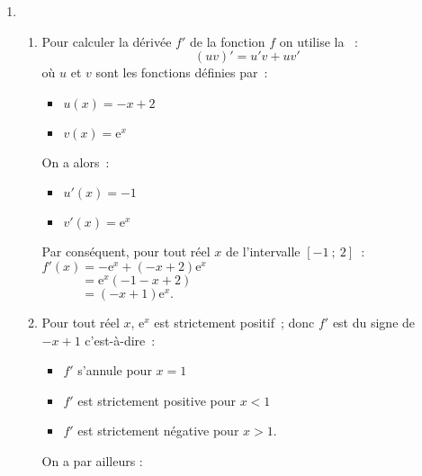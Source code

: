 \begin{corrige}
     \begin{enumerate}
          \item
          \begin{enumerate}[label=\alph*.]
               \item
               Pour calculer la dérivée $f'$ de la fonction $f$ on utilise la ~:
               \[
               ( uv )' =u' v+uv'
               \]
               où  $u$ et $v$ sont les fonctions définies par~:\\
               \begin{itemize}
                    \item
                    $u( x )= - x+2$
                    \item
                    $v( x )=\text{e}^{ x }$
               \end{itemize}
               On a alors~:
               \begin{itemize}
                    \item
                    $u' ( x )= - 1$
                    \item
                    $v' ( x )=\text{e}^{ x }$
               \end{itemize}
               Par conséquent, pour tout réel $x$ de l'intervalle  $\left[  - 1~;~2\right]$~:
               \newpar
               $f' ( x )= - \text{e}^{ x }+(  - x+2 )\text{e}^{ x }$\\
               $\phantom{f' ( x )}=\text{e}^{ x }\left(  - 1 - x+2 \right)$\\
               $\phantom{f' ( x )}=\left(  - x+1 \right)\text{e}^{ x }.$
               \item
               Pour tout réel $x$,  $\text{e}^{ x }$ est strictement positif~; donc $f' $ est du signe de  $ - x+1$ c'est-à-dire~:
               \begin{itemize}
                    \item
                    $f' $ s'annule pour $x=1$
                    \item
                    $f' $ est strictement positive pour $x < 1$
                    \item
                    $f' $ est strictement négative pour $x > 1. $
               \end{itemize}
               \newpar
               On a par ailleurs :
               \begin{itemize}

\end{itemize}
\end{enumerate}
\end{enumerate}
\end{corrige}

